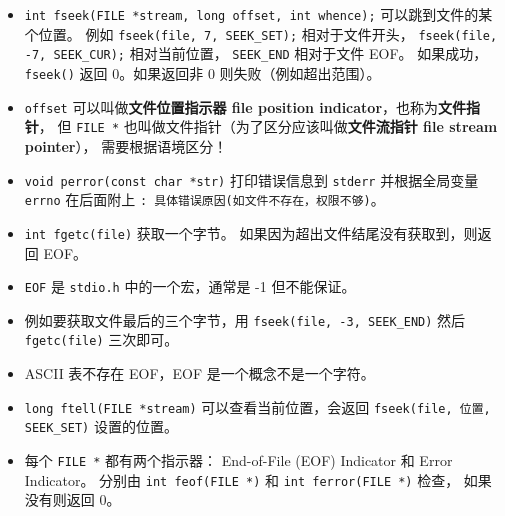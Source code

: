 \begin{itemize}
\begin{lstlisting}[language=cpp]
    // Step 3: Read from the file and print its
    // contents to the console
    char buffer[100];
    printf("Reading the file contents:\n");
    while (fgets(buffer, sizeof(buffer), file) != NULL) {
        printf("%s", buffer);
    }

    // Step 4: Move the file pointer to a specific location, modify contents
    fseek(file, 7, SEEK_SET); // Jump to the 8th character
    fputs("Universe", file);  // Overwrite "World" with "Universe"

    // Step 5: Jump to the beginning again to read the updated content
    fseek(file, 0, SEEK_SET);
    printf("\nUpdated file contents:\n");
    while (fgets(buffer, sizeof(buffer), file) != NULL) {
        printf("%s", buffer);
    }

    // Close the file
    fclose(file);
    return 0;
}
\end{lstlisting}
\item \verb`int fseek(FILE *stream, long offset, int whence);` 可以跳到文件的某个位置。 例如 \verb`fseek(file, 7, SEEK_SET);` 相对于文件开头， \verb`fseek(file, -7, SEEK_CUR);` 相对当前位置， \verb`SEEK_END` 相对于文件 EOF。 如果成功，\verb`fseek()` 返回 0。如果返回非 0 则失败（例如超出范围）。
\item \verb`offset` 可以叫做\textbf{文件位置指示器 file position indicator}，也称为\textbf{文件指针}， 但 \verb`FILE *` 也叫做文件指针（为了区分应该叫做\textbf{文件流指针 file stream pointer}）， 需要根据语境区分！
\item \verb`void perror(const char *str)` 打印错误信息到 \verb`stderr` 并根据全局变量 \verb`errno` 在后面附上 \verb`: 具体错误原因(如文件不存在，权限不够)`。
\item \verb`int fgetc(file)` 获取一个字节。 如果因为超出文件结尾没有获取到，则返回 EOF。
\item \verb`EOF` 是 \verb`stdio.h` 中的一个宏，通常是 -1 但不能保证。
\item 例如要获取文件最后的三个字节，用 \verb`fseek(file, -3, SEEK_END)` 然后 \verb`fgetc(file)` 三次即可。
\item ASCII 表不存在 EOF，EOF 是一个概念不是一个字符。
\item \verb`long ftell(FILE *stream)` 可以查看当前位置，会返回 \verb`fseek(file, 位置, SEEK_SET)` 设置的位置。
\item 每个 \verb`FILE *` 都有两个指示器： End-of-File (EOF) Indicator 和 Error Indicator。 分别由 \verb`int feof(FILE *)` 和 \verb`int ferror(FILE *)` 检查， 如果没有则返回 0。
\end{itemize}
